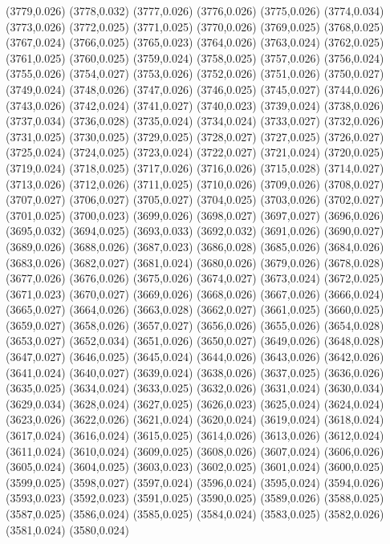 (3779,0.026)
(3778,0.032)
(3777,0.026)
(3776,0.026)
(3775,0.026)
(3774,0.034)
(3773,0.026)
(3772,0.025)
(3771,0.025)
(3770,0.026)
(3769,0.025)
(3768,0.025)
(3767,0.024)
(3766,0.025)
(3765,0.023)
(3764,0.026)
(3763,0.024)
(3762,0.025)
(3761,0.025)
(3760,0.025)
(3759,0.024)
(3758,0.025)
(3757,0.026)
(3756,0.024)
(3755,0.026)
(3754,0.027)
(3753,0.026)
(3752,0.026)
(3751,0.026)
(3750,0.027)
(3749,0.024)
(3748,0.026)
(3747,0.026)
(3746,0.025)
(3745,0.027)
(3744,0.026)
(3743,0.026)
(3742,0.024)
(3741,0.027)
(3740,0.023)
(3739,0.024)
(3738,0.026)
(3737,0.034)
(3736,0.028)
(3735,0.024)
(3734,0.024)
(3733,0.027)
(3732,0.026)
(3731,0.025)
(3730,0.025)
(3729,0.025)
(3728,0.027)
(3727,0.025)
(3726,0.027)
(3725,0.024)
(3724,0.025)
(3723,0.024)
(3722,0.027)
(3721,0.024)
(3720,0.025)
(3719,0.024)
(3718,0.025)
(3717,0.026)
(3716,0.026)
(3715,0.028)
(3714,0.027)
(3713,0.026)
(3712,0.026)
(3711,0.025)
(3710,0.026)
(3709,0.026)
(3708,0.027)
(3707,0.027)
(3706,0.027)
(3705,0.027)
(3704,0.025)
(3703,0.026)
(3702,0.027)
(3701,0.025)
(3700,0.023)
(3699,0.026)
(3698,0.027)
(3697,0.027)
(3696,0.026)
(3695,0.032)
(3694,0.025)
(3693,0.033)
(3692,0.032)
(3691,0.026)
(3690,0.027)
(3689,0.026)
(3688,0.026)
(3687,0.023)
(3686,0.028)
(3685,0.026)
(3684,0.026)
(3683,0.026)
(3682,0.027)
(3681,0.024)
(3680,0.026)
(3679,0.026)
(3678,0.028)
(3677,0.026)
(3676,0.026)
(3675,0.026)
(3674,0.027)
(3673,0.024)
(3672,0.025)
(3671,0.023)
(3670,0.027)
(3669,0.026)
(3668,0.026)
(3667,0.026)
(3666,0.024)
(3665,0.027)
(3664,0.026)
(3663,0.028)
(3662,0.027)
(3661,0.025)
(3660,0.025)
(3659,0.027)
(3658,0.026)
(3657,0.027)
(3656,0.026)
(3655,0.026)
(3654,0.028)
(3653,0.027)
(3652,0.034)
(3651,0.026)
(3650,0.027)
(3649,0.026)
(3648,0.028)
(3647,0.027)
(3646,0.025)
(3645,0.024)
(3644,0.026)
(3643,0.026)
(3642,0.026)
(3641,0.024)
(3640,0.027)
(3639,0.024)
(3638,0.026)
(3637,0.025)
(3636,0.026)
(3635,0.025)
(3634,0.024)
(3633,0.025)
(3632,0.026)
(3631,0.024)
(3630,0.034)
(3629,0.034)
(3628,0.024)
(3627,0.025)
(3626,0.023)
(3625,0.024)
(3624,0.024)
(3623,0.026)
(3622,0.026)
(3621,0.024)
(3620,0.024)
(3619,0.024)
(3618,0.024)
(3617,0.024)
(3616,0.024)
(3615,0.025)
(3614,0.026)
(3613,0.026)
(3612,0.024)
(3611,0.024)
(3610,0.024)
(3609,0.025)
(3608,0.026)
(3607,0.024)
(3606,0.026)
(3605,0.024)
(3604,0.025)
(3603,0.023)
(3602,0.025)
(3601,0.024)
(3600,0.025)
(3599,0.025)
(3598,0.027)
(3597,0.024)
(3596,0.024)
(3595,0.024)
(3594,0.026)
(3593,0.023)
(3592,0.023)
(3591,0.025)
(3590,0.025)
(3589,0.026)
(3588,0.025)
(3587,0.025)
(3586,0.024)
(3585,0.025)
(3584,0.024)
(3583,0.025)
(3582,0.026)
(3581,0.024)
(3580,0.024)
